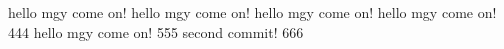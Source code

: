 hello mgy  come on!
hello mgy  come on!
hello mgy  come on!
hello mgy  come on! 444
hello mgy  come on! 555
second commit!  666
